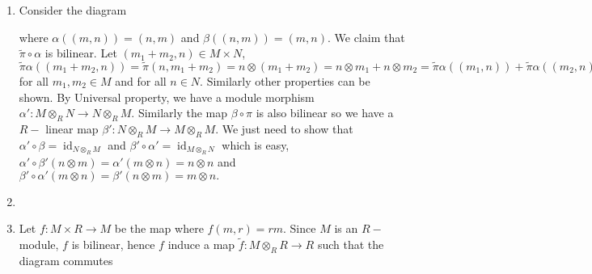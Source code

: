 \documentclass[11pt]{amsart}
\DeclareMathOperator{\id}{\text{id}}
\begin{document}
\proof \begin{enumerate}
\item Consider the diagram 

\begin{center}


\end{center}

where $\alpha((m,n))=(n,m)$ and $\beta((n,m))=(m,n).$ We claim that $\tilde{\pi}\circ\alpha$ is bilinear. Let $(m_1+m_2,n)\in M\times N$, $\tilde{\pi}\alpha((m_1+m_2,n))=\tilde{\pi}(n,m_1+m_2)=n\otimes (m_1+m_2)=n\otimes m_1+n\otimes m_2=\tilde{\pi}\alpha((m_1,n))+\tilde{\pi}\alpha((m_2,n))$ for all $m_1,m_2\in M$ and for all $n\in N.$ Similarly other properties can be shown. By Universal property, we have a module morphism $\alpha':M\otimes_R N\to N\otimes_R M.$ Similarly the map $\beta\circ \pi$ is also bilinear so we have a $R-$ linear map $\beta':N\otimes_R M\to M\otimes_R M.$ We just need to show that $\alpha'\circ \beta=\id_{N\otimes_R M}$ and $\beta'\circ \alpha'=\id_{M\otimes_R N}$ which is easy, $\alpha'\circ \beta'(n\otimes m)=\alpha'(m\otimes n)=n\otimes n$ and $\beta'\circ \alpha'(m\otimes n)=\beta'(n\otimes m)=m\otimes n.$

\item 

\item Let $f:M\times R\to M$ be the map where $f(m,r)=rm.$ Since $M$ is an $R-$module, $f$ is bilinear, hence $f$ induce a map $\tilde{f}:M\otimes_R R\to R$ such that the diagram commutes

\begin{center}
\end{center}


\end{enumerate}
\end{document}
